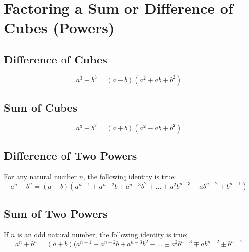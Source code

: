 	\section{Factoring a Sum or Difference of Cubes (Powers)}
		\subsection{Difference of Cubes} 
			\[a^3-b^3=(a-b)(a^2+ab+b^2)\]
		\subsection{Sum of Cubes}
			\[a^3+b^3=(a+b)(a^2-ab+b^2)\]
		\subsection{Difference of Two Powers}
			For any natural number $n$, the following identity is true:
			\[a^n-b^n=(a-b)(a^{n-1}+a^{n-2}b+a^{n-3}b^2+\dots+a^2b^{n-3}+ab^{n-2}+b^{n-1})\]
		\subsection{Sum of Two Powers}
			If $n$ is an odd natural number, the following identity is true:
			\[a^n+b^n=(a+b)(a^{n-1}-a^{n-2}b+a^{n-3}b^2-\dots\pm a^2b^{n-3} \mp ab^{n-2} \pm b^{n-1}\]

